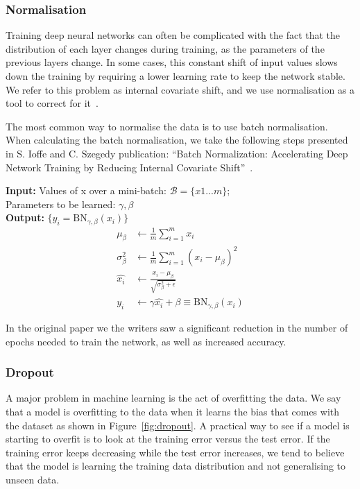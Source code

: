 \subsubsection{Normalisation}
\label{cha:normalisation}
Training deep neural networks can often be complicated with the fact that the distribution of each layer changes during training, as the parameters of the previous layers change. In some cases, this constant shift of input values slows down the training by requiring a lower learning rate to keep the network stable.
We refer to this problem as internal covariate shift, and we use normalisation as a tool to correct for it~\cite{DBLP:journals/corr/IoffeS15}.

The most common way to normalise the data is to use batch normalisation. When calculating the batch normalisation, we take the following steps presented in S. Ioffe and C. Szegedy publication: ``Batch Normalization: Accelerating Deep Network Training by Reducing Internal Covariate Shift''~\cite{DBLP:journals/corr/IoffeS15}.\\

\begin{minipage}{\textwidth}	
\noindent \textbf{Input:} Values of x over a mini-batch: $\mathcal{B} = \{x1...m\}$;\\
\noindent Parameters to be learned: $\gamma, \beta$\\
\noindent \textbf{Output:} $\{y_i = \text{BN}_{\gamma,\beta}(x_i)\}$\\
\begin{align*}
\mu_{\beta} &\leftarrow \frac{1}{m} \sum_{i=1}^{m} x_i   \tag{mini-batch mean}\\
\sigma_{\beta}^2 &\leftarrow \frac{1}{m} \sum_{i=1}^{m} (x_i-\mu_{\beta})^2 \tag{mini-batch variance}\\
\widehat{x_i} &\leftarrow \frac{x_i - \mu_{\beta}}{\sqrt{\sigma_{\beta}^2+\epsilon}} \tag{normalise}\\
y_i &\leftarrow \gamma\widehat{x_i}  + \beta \equiv \text{BN}_{\gamma,\beta}(x_i) \tag{scale and shift}
\end{align*}
\label{eq:BN}
\end{minipage}

In the original paper we the writers saw a significant reduction in the number of epochs needed to train the network, as well as increased accuracy.


\subsubsection{Dropout}
A major problem in machine learning is the act of overfitting the data. We say that a model is overfitting to the data when it learns the bias that comes with the dataset as shown in Figure~\ref{fig:dropout}. A practical way to see if a model is starting to overfit is to look at the training error versus the test error. If the training error keeps decreasing while the test error increases, we tend to believe that the model is learning the training data distribution and not generalising to unseen data.


